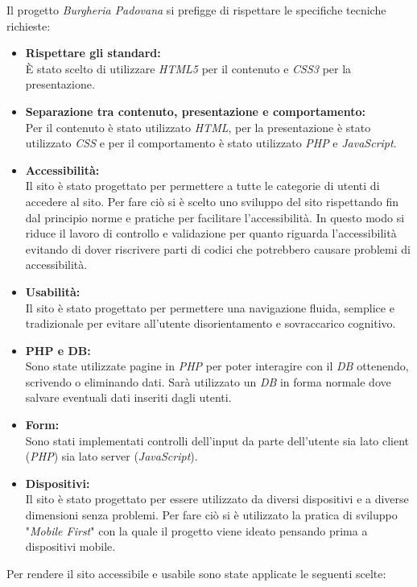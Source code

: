Il progetto \emph{Burgheria Padovana} si prefigge di rispettare le specifiche tecniche richieste:
\begin{itemize}
	\item \textbf{Rispettare gli standard:}\\ 
	È stato scelto di utilizzare \emph{HTML5} per il contenuto e \emph{CSS3} per la presentazione.
	\item \textbf{Separazione tra contenuto, presentazione e comportamento:}\\ 
	Per il contenuto è stato utilizzato \emph{HTML}, per la presentazione è stato utilizzato \emph{CSS} e per il comportamento è stato utilizzato \emph{PHP} e \emph{JavaScript}.
	\item \textbf{Accessibilità:}\\ 
	Il sito è stato progettato per permettere a tutte le categorie di utenti di accedere al sito.
	Per fare ciò si è scelto uno sviluppo del sito rispettando fin dal principio norme e pratiche per facilitare l'accessibilità.
	In questo modo si riduce il lavoro di controllo e validazione per quanto riguarda l'accessibilità evitando di dover riscrivere parti di codici che potrebbero causare problemi di accessibilità.
	\item \textbf{Usabilità:}\\
	Il sito è stato progettato per permettere una navigazione fluida, semplice e tradizionale per evitare all'utente disorientamento e sovraccarico cognitivo.
	\item \textbf{PHP e DB:}\\
	Sono state utilizzate pagine in \emph{PHP} per poter interagire con il \emph{DB} ottenendo, scrivendo o eliminando dati. Sarà utilizzato un \emph{DB} in forma normale dove salvare eventuali dati inseriti dagli utenti.
	\item \textbf{Form:}\\
	Sono stati implementati controlli dell'input da parte dell'utente sia lato client (\emph{PHP}) sia lato server (\emph{JavaScript}).
	\item \textbf{Dispositivi:}\\
	Il sito è stato progettato per essere utilizzato da diversi dispositivi e a diverse dimensioni senza problemi. Per fare ciò si è utilizzato la pratica di sviluppo "\emph{Mobile First}" con la quale il progetto viene ideato pensando prima a dispositivi mobile.
\end{itemize}
Per rendere il sito accessibile e usabile sono state applicate le seguenti scelte: 
